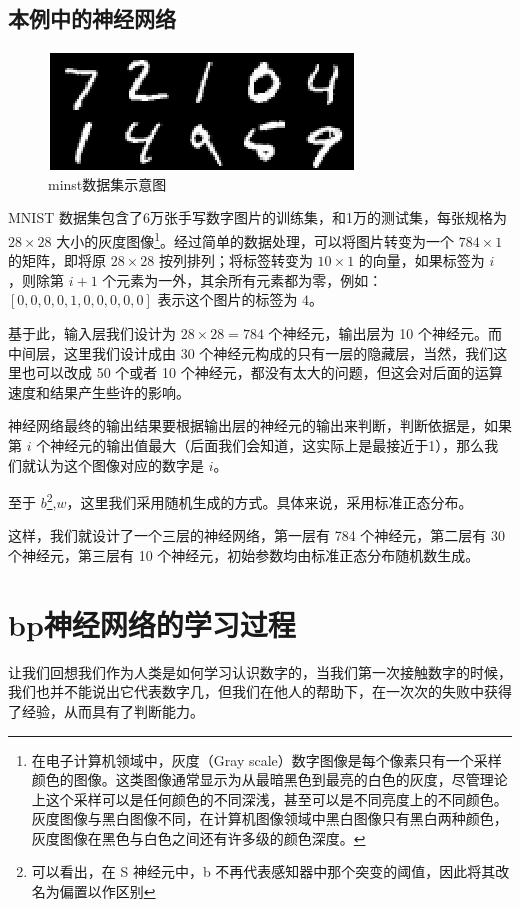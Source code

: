 \documentclass{ctexart}
\numberwithin{equation}{section}    %
\begin{document}
\subsection{本例中的神经网络}
\begin{figure}[htp]
    \centering
    \includegraphics[width=0.7\linewidth]{fig/图片.eps}
    \caption{minst数据集示意图}
\end{figure}

\label{subsec:神经网络}
MNIST 数据集包含了6万张手写数字图片的训练集，和1万的测试集，每张规格为 $28\times28$ 大小的灰度图像\footnote{在电子计算机领域中，灰度（Gray scale）数字图像是每个像素只有一个采样颜色的图像。这类图像通常显示为从最暗黑色到最亮的白色的灰度，尽管理论上这个采样可以是任何颜色的不同深浅，甚至可以是不同亮度上的不同颜色。灰度图像与黑白图像不同，在计算机图像领域中黑白图像只有黑白两种颜色，灰度图像在黑色与白色之间还有许多级的颜色深度。}。经过简单的数据处理，可以将图片转变为一个 $784\times 1$ 的矩阵，即将原 $28\times28$ 按列排列；将标签转变为 $10\times 1$ 的向量，如果标签为 $i$ ，则除第 $i+1$ 个元素为一外，其余所有元素都为零，例如：$[0,0,0,0,1,0,0,0,0,0]$ 表示这个图片的标签为 $4$。

基于此，输入层我们设计为 $28\times28=784$ 个神经元，输出层为 10 个神经元。而中间层，这里我们设计成由 30 个神经元构成的只有一层的隐藏层，当然，我们这里也可以改成 50 个或者 10 个神经元，都没有太大的问题，但这会对后面的运算速度和结果产生些许的影响。

神经网络最终的输出结果要根据输出层的神经元的输出来判断，判断依据是，如果第 $i$ 个神经元的输出值最大（后面我们会知道，这实际上是最接近于1），那么我们就认为这个图像对应的数字是 $i$。

至于 $b$\footnote{可以看出，在 S 神经元中，b 不再代表感知器中那个突变的阈值，因此将其改名为偏置以作区别},$w$，这里我们采用随机生成的方式。具体来说，采用标准正态分布。

这样，我们就设计了一个三层的神经网络，第一层有 784 个神经元，第二层有 30 个神经元，第三层有 10 个神经元，初始参数均由标准正态分布随机数生成。
\section{bp神经网络的学习过程}
让我们回想我们作为人类是如何学习认识数字的，当我们第一次接触数字的时候，我们也并不能说出它代表数字几，但我们在他人的帮助下，在一次次的失败中获得了经验，从而具有了判断能力。
\end{document}
